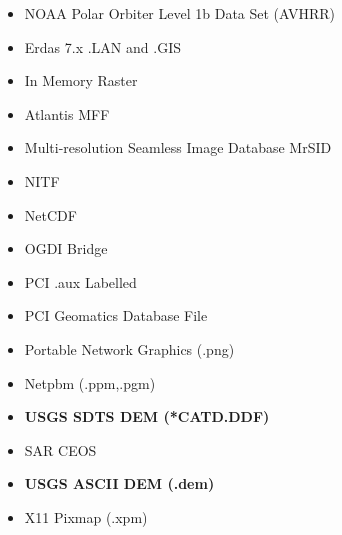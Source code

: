 \begin{itemize}
\item NOAA Polar Orbiter Level 1b Data Set (AVHRR)
\item Erdas 7.x .LAN and .GIS
\item In Memory Raster
\item Atlantis MFF
\item Multi-resolution Seamless Image Database  MrSID
\item NITF
\item NetCDF
\item OGDI Bridge
\item PCI .aux Labelled
\item PCI Geomatics Database File
\item Portable Network Graphics (.png)
\item Netpbm (.ppm,.pgm)
\item \textbf{USGS SDTS DEM (*CATD.DDF)}
\item SAR CEOS
\item \textbf{USGS ASCII DEM (.dem)}
\item X11 Pixmap (.xpm)

\end{itemize}
\clearpage
